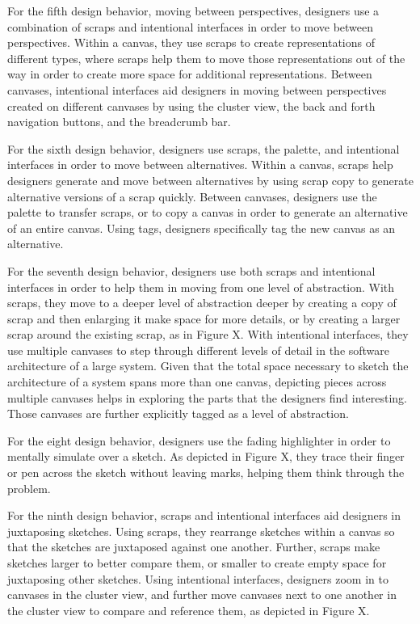 \documentclass[12pt,fleqn]{ucithesis}
\begin{document}
For the fifth design behavior, moving between perspectives, designers use a combination of scraps and intentional interfaces in order to move between perspectives. Within a canvas, they use scraps to create representations of different types, where scraps help them to move those representations out of the way in order to create more space for additional representations. Between canvases, intentional interfaces aid designers in moving between perspectives created on different canvases by using the cluster view, the back and forth navigation buttons, and the breadcrumb bar.

For the sixth design behavior, designers use scraps, the palette, and intentional interfaces in order to move between alternatives. Within a canvas, scraps help designers generate and move between alternatives by using scrap copy to generate alternative versions of a scrap quickly. Between canvases, designers use the palette to transfer scraps, or to copy a canvas in order to generate an alternative of an entire canvas. Using tags, designers specifically tag the new canvas as an alternative.

For the seventh design behavior, designers use both scraps and intentional interfaces in order to help them in moving from one level of abstraction. With scraps, they move to a deeper level of abstraction deeper by creating a copy of scrap and then enlarging it make space for more details, or by creating a larger scrap around the existing scrap, as in Figure X. With intentional interfaces, they use multiple canvases to step through different levels of detail in the software architecture of a large system. Given that the total space necessary to sketch the architecture of a system spans more than one canvas, depicting pieces across multiple canvases helps in exploring the parts that the designers find interesting. Those canvases are further explicitly tagged as a level of abstraction.

For the eight design behavior, designers use the fading highlighter in order to mentally simulate over a sketch. As depicted in Figure X, they trace their finger or pen across the sketch without leaving marks, helping them think through the problem.

For the ninth design behavior, scraps and intentional interfaces aid designers in juxtaposing sketches. Using scraps, they rearrange sketches within a canvas so that the sketches are juxtaposed against one another. Further, scraps make sketches larger to better compare them, or smaller to create empty space for juxtaposing other sketches. Using intentional interfaces, designers zoom in to canvases in the cluster view, and further move canvases next to one another in the cluster view to compare and reference them, as depicted in Figure X.
\end{document}
